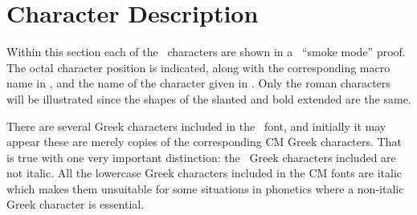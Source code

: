 \section{Character Description}

Within this section each of the \wsu\ characters are shown in a \MF\
``smoke mode'' proof. The octal character position is indicated, along
with the corresponding macro name in \ipam, and the name of the
character given in \PL. Only the roman characters will be illustrated
since the shapes of the slanted and bold extended are the same.

There are several Greek characters included in the \wsu\ font, and
initially it may appear these are merely copies of the corresponding
CM Greek characters. That is true with one very important distinction:
the \wsu\ Greek characters included are not italic. All the lowercase
Greek characters included in the CM fonts are italic which makes them
unsuitable for some situations in phonetics where a non-italic Greek
character is essential.

